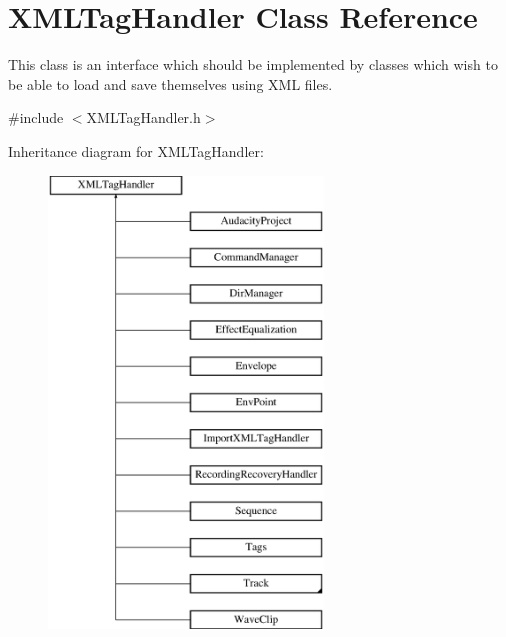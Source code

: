 \hypertarget{class_x_m_l_tag_handler}{}\section{X\+M\+L\+Tag\+Handler Class Reference}
\label{class_x_m_l_tag_handler}


This class is an interface which should be implemented by classes which wish to be able to load and save themselves using X\+ML files.  




{\ttfamily \#include $<$X\+M\+L\+Tag\+Handler.\+h$>$}

Inheritance diagram for X\+M\+L\+Tag\+Handler\+:\begin{figure}[H]
\begin{center}
\leavevmode
\includegraphics[height=12.000000cm]{class_x_m_l_tag_handler}
\end{center}
\end{figure}

